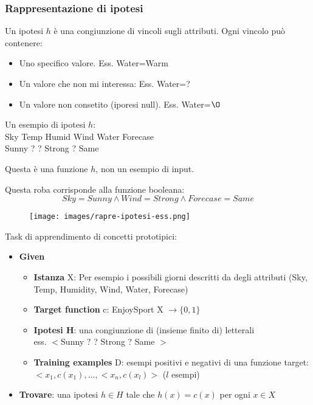 \subsubsection{Rappresentazione di ipotesi}
Un ipotesi $h$ è una congiunzione di vincoli sugli attributi. Ogni vincolo può contenere:
\begin{itemize}
    \item Uno specifico valore. Ess. Water=Warm
    \item Un valore che non mi interessa: Ess. Water=?
    \item Un valore non consetito (iporesi null). Ess. Water=$\O$
\end{itemize}
\begin{example}
    Un esempio di ipotesi $h$:\\
    Sky \hfill Temp \hfill Humid \hfill Wind \hfill Water \hfill Forecase\\
    Sunny \hfill ? \hfill ? \hfill Strong \hfill ? \hfill Same
    \begin{note}
        Questa è una funzione $h$, non un esempio di input.
    \end{note}
    \hspace{-15pt}Questa roba corrisponde alla funzione booleana:
    $$Sky = Sunny \land Wind = Strong \land Forecase = Same$$
    \begin{figure}[h!]
        \vspace{-15pt}
        \centering
        \texttt{[image: images/rapre-ipotesi-ess.png]}
    \end{figure}
\end{example}
\begin{definition}
    Task di apprendimento di concetti prototipici:
    \begin{itemize}
        \item \textbf{Given}
        \begin{itemize}
            \item \textbf{Istanza} X: Per esempio i possibili giorni descritti da degli attributi (Sky, Temp, Humidity, Wind, Water, Forecase)
            \item \textbf{Target function} c: EnjoySport X $\to \{0, 1\}$
            \item \textbf{Ipotesi H}: una congiunzione di (insieme finito di) letterali \\
            ess. $<$Sunny\:\: ? \:\:?\:\: Strong \:\:?\:\: Same $>$
            \item \textbf{Training examples} D: esempi positivi e negativi di una funzione target: $<x_1, c(x_1), \dots, <x_n, c(x_l)>$ ($l$ esempi)
        \end{itemize}
        \item \textbf{Trovare}: una ipotesi $h \in H$ tale che $h(x) = c(x)$ per ogni $x \in X$
    \end{itemize}
\end{definition}
